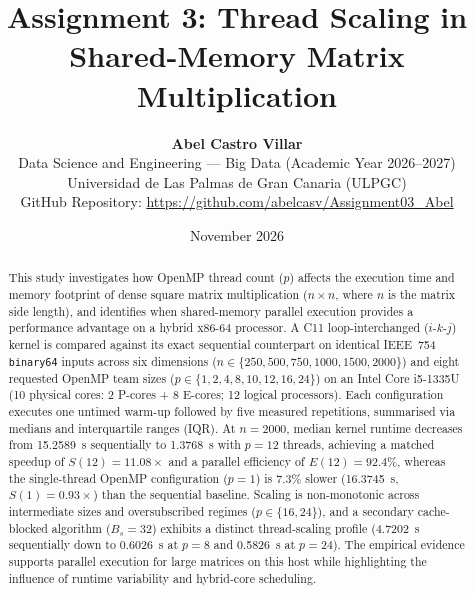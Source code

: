 \documentclass[11pt,a4paper]{article}
\begin{document}
\title{\vspace{-1.3cm}\textbf{Assignment 3: Thread Scaling in Shared-Memory Matrix Multiplication}}
\author{
    \textbf{Abel Castro Villar}\\
    Data Science and Engineering --- Big Data (Academic Year 2026--2027)\\
    Universidad de Las Palmas de Gran Canaria (ULPGC)\\
    GitHub Repository: \url{https://github.com/abelcasv/Assignment03_Abel}
}
\date{November 2026}

\maketitle
\vspace{-0.55cm}

\begin{abstract}
\noindent This study investigates how OpenMP thread count ($p$) affects the execution time and memory footprint of dense square matrix multiplication ($n \times n$, where $n$ is the matrix side length), and identifies when shared-memory parallel execution provides a performance advantage on a hybrid x86-64 processor. A C11 loop-interchanged ($i\text{-}k\text{-}j$) kernel is compared against its exact sequential counterpart on identical IEEE~754 \texttt{binary64} inputs across six dimensions ($n \in \{250, 500, 750, 1000, 1500, 2000\}$) and eight requested OpenMP team sizes ($p \in \{1, 2, 4, 8, 10, 12, 16, 24\}$) on an Intel Core i5-1335U (10 physical cores: 2 P-cores + 8 E-cores; 12 logical processors). Each configuration executes one untimed warm-up followed by five measured repetitions, summarised via medians and interquartile ranges (IQR). At $n=2000$, median kernel runtime decreases from \SI{15.2589}{\second} sequentially to \SI{1.3768}{\second} with $p=12$ threads, achieving a matched speedup of $S(12) = 11.08\times$ and a parallel efficiency of $E(12) = 92.4\%$, whereas the single-thread OpenMP configuration ($p=1$) is $7.3\%$ slower (\SI{16.3745}{\second}, $S(1)=0.93\times$) than the sequential baseline. Scaling is non-monotonic across intermediate sizes and oversubscribed regimes ($p \in \{16, 24\}$), and a secondary cache-blocked algorithm ($B_s = 32$) exhibits a distinct thread-scaling profile (\SI{4.7202}{\second} sequentially down to \SI{0.6026}{\second} at $p=8$ and \SI{0.5826}{\second} at $p=24$). The empirical evidence supports parallel execution for large matrices on this host while highlighting the influence of runtime variability and hybrid-core scheduling.
\end{abstract}
\end{document}
